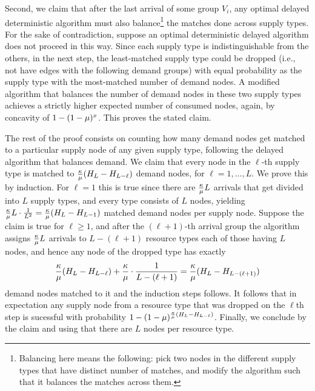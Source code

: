 Second, we claim that after the last arrival of some group $V_i$, any optimal delayed deterministic algorithm must also balance\footnote{Balancing here means the following: pick two nodes in the different supply types that have distinct number of matches, and modify the algorithm such that it balances the matches across them.} the matches done across supply types. For the sake of contradiction, suppose an optimal deterministic delayed algorithm does not proceed in this way. Since each supply type is indistinguishable from the others, in the next step, the least-matched supply type could be dropped (i.e., not have edges with the following demand groups) with equal probability as the supply type with the most-matched number of demand nodes. A modified algorithm that balances the number of demand nodes in these two supply types achieves a strictly higher expected number of consumed nodes, again, by concavity of $1-(1-\mu)^{x}$. This proves the stated claim.

The rest of the proof consists on counting how many demand nodes get matched to a particular supply node of any given supply type, following the delayed algorithm that balances demand. We claim that every node in the $\ell$-th supply type is matched to $\frac{\kappa}{\mu} (H_L - H_{L-\ell})$ demand nodes, for $\ell = 1, \ldots, L$. We prove this by induction. For $\ell = 1$ this is true since there are $\frac{\kappa}{\mu} L$ arrivals that get divided into $L$ supply types, and every type consists of $L$ nodes, yielding $\frac{\kappa}{\mu} L \cdot \frac{1}{L^2} = \frac{\kappa}{\mu} (H_L - H_{L-1})$ matched demand nodes per supply node. Suppose the claim is true for $\ell \geq 1$, and after the $(\ell+1)$-th arrival group the algorithm assigns $\frac{\kappa}{\mu} L$ arrivals to $L-(\ell+1)$ resource types each of those having $L$ nodes, and hence any node of the dropped type has exactly
\begin{equation*}
    \frac{\kappa}{\mu} (H_L - H_{L-\ell}) + \frac{\kappa}{\mu} \cdot \frac{1}{L-(\ell+1)} = \frac{\kappa}{\mu} (H_L - H_{L-(\ell+1)})
\end{equation*}
demand nodes matched to it and the induction steps follows. It follows that in expectation any supply node from a resource type that was dropped on the $\ell$th step is sucessful with probability $ 1 - (1-\mu)^{\frac{\kappa}{\mu} (H_L - H_{L-\ell})}$. Finally, we conclude by the claim and using that there are $L$ nodes per resource type.
\hfill\Halmos %

